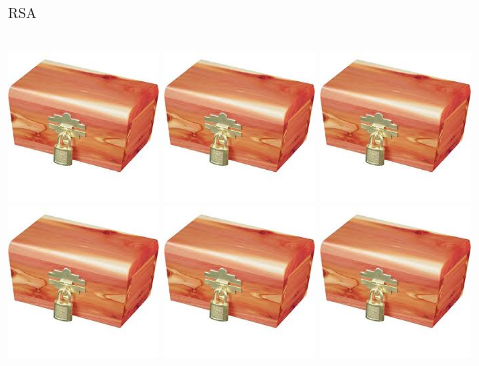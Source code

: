 \documentclass{beamer}
\begin{document}
\begin{frame}{RSA}
\begin{columns}
		\begin{column}[T]{0.5\textwidth}
			\includegraphics[width=0.3\textwidth]{img/padlock.jpeg}
			\includegraphics[width=0.3\textwidth]{img/padlock.jpeg}
			\includegraphics[width=0.3\textwidth]{img/padlock.jpeg} \\
			\includegraphics[width=0.3\textwidth]{img/padlock.jpeg}
			\includegraphics[width=0.3\textwidth]{img/padlock.jpeg}
			\includegraphics[width=0.3\textwidth]{img/padlock.jpeg} \\

\end{column}
\end{columns}
\end{frame}
\end{document}

